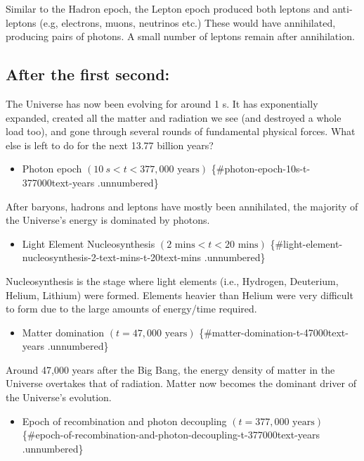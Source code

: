 \documentclass[11pt,a4paper,notoc]{tufte-handout}
\providecommand{\tightlist}{%
  \setlength{\itemsep}{0pt}\setlength{\parskip}{0pt}}
\begin{document}
Similar to the Hadron epoch, the Lepton epoch produced both leptons and
anti-leptons (e.g, electrons, muons, neutrinos etc.) These would have
annihilated, producing pairs of photons. A small number of leptons
remain after annihilation.

\hypertarget{sec:after_1s}{%
\subsection{After the first second:}\label{sec:after_1s}}

The Universe has now been evolving for around 1 s. It has exponentially
expanded, created all the matter and radiation we see (and destroyed a
whole load too), and gone through several rounds of fundamental physical
forces. What else is left to do for the next 13.77 billion years?

\begin{itemize}
\tightlist
\item
  Photon epoch \((10~s < t < 377,000\text{ years})\) \{\#photon-epoch-10s-t-377000text-years .unnumbered\}
\end{itemize}

After baryons, hadrons and leptons have mostly been annihilated, the
majority of the Universe's energy is dominated by photons.

\begin{itemize}
\tightlist
\item
  Light Element Nucleosynthesis \((2 \text{ mins} < t < 20\text{ mins})\) \{\#light-element-nucleosynthesis-2-text-mins-t-20text-mins .unnumbered\}
\end{itemize}

Nucleosynthesis is the stage where light elements (i.e., Hydrogen,
Deuterium, Helium, Lithium) were formed. Elements heavier than Helium
were very difficult to form due to the large amounts of energy/time
required.

\begin{itemize}
\tightlist
\item
  Matter domination \((t = 47,000\text{ years})\) \{\#matter-domination-t-47000text-years .unnumbered\}
\end{itemize}

Around 47,000 years after the Big Bang, the energy density of matter in
the Universe overtakes that of radiation. Matter now becomes the
dominant driver of the Universe's evolution.

\begin{itemize}
\tightlist
\item
  Epoch of recombination and photon decoupling \((t = 377,000\text{ years})\) \{\#epoch-of-recombination-and-photon-decoupling-t-377000text-years .unnumbered\}
\end{itemize}
\end{document}
